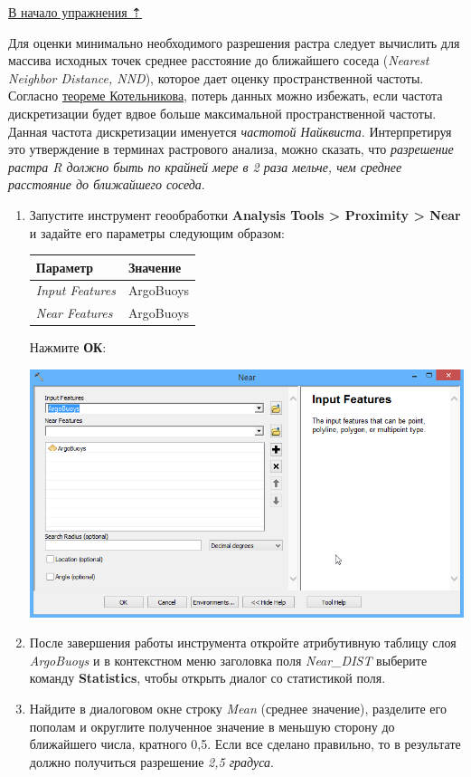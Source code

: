 \documentclass[]{book}
\theoremstyle{definition}
\theoremstyle{definition}
\theoremstyle{definition}
\theoremstyle{remark}
\begin{document}
\protect\hyperlink{interpolation}{В начало упражнения ⇡}

Для оценки минимально необходимого разрешения растра следует вычислить
для массива исходных точек среднее расстояние до ближайшего соседа
(\emph{Nearest Neighbor Distance, NND}), которое дает оценку
пространственной частоты. Согласно
\href{https://ru.wikipedia.org/wiki/Теорема_Котельникова}{теореме
Котельникова}, потерь данных можно избежать, если частота дискретизации
будет вдвое больше максимальной пространственной частоты. Данная частота
дискретизации именуется \emph{частотой Найквиста}. Интерпретируя это
утверждение в терминах растрового анализа, можно сказать, что
\emph{разрешение растра R должно быть по крайней мере в 2 раза мельче,
чем среднее расстояние до ближайшего соседа}.

\begin{enumerate}
\def\labelenumi{\arabic{enumi}.}
\item
  Запустите инструмент геообработки \textbf{Analysis Tools
  \textgreater{} Proximity \textgreater{} Near} и задайте его параметры
  следующим образом:

  \begin{longtable}[]{@{}ll@{}}
  \toprule
  Параметр & Значение\tabularnewline
  \midrule
  \endhead
  \emph{Input Features} & ArgoBuoys\tabularnewline
  \emph{Near Features} & ArgoBuoys\tabularnewline
  \bottomrule
  \end{longtable}

  Нажмите \textbf{ОК}:

  \includegraphics{images/Ex17/image8.png}
\item
  После завершения работы инструмента откройте атрибутивную таблицу слоя
  \emph{ArgoBuoys} и в контекстном меню заголовка поля \emph{Near\_DIST}
  выберите команду \textbf{Statistics}, чтобы открыть диалог со
  статистикой поля.
\item
  Найдите в диалоговом окне строку \emph{Mean} (среднее значение),
  разделите его пополам и округлите полученное значение в меньшую
  сторону до ближайшего числа, кратного 0,5. Если все сделано правильно,
  то в результате должно получиться разрешение \emph{2,5 градуса}.
\end{enumerate}
\end{document}
